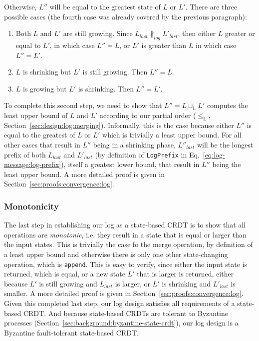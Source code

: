 \documentclass[9pt, oneside]{article}   	%
\begin{document}
Otherwise, $L''$ will be equal to the greatest state of $L$ or $L'$. There are three possible cases (the fourth case was already covered by the previous paragraph):
\begin{enumerate}
	\item Both $L$ and $L'$ are still growing. Since $L_\textit{last} \not\parallel_\textit{log} L'_\textit{last}$, then either $L$ greater or equal to $L'$, in which case $L''=L$, or $L'$ is greater than $L$ in which case $L'' = L'$.
	\item $L$ is shrinking but $L'$ is still growing. Then $L''=L$.
	\item $L$ is growing but $L'$ is shrinking. Then $L''=L'$.
\end{enumerate}

To complete this second step, we need to show that $L''=L \sqcup_\mathds{L} L'$ computes the least upper bound of $L$ and $L'$ according to our partial order ($\leq_\mathds{L}$, Section~\ref{sec:design:log:merging}). Informally, this is the case because either $L''$ is equal to the greatest of $L$ or $L'$ which is trivially a least upper bound. For all other cases that result in $L''$ being in a shrinking phase, $L''_\textit{last}$ will be the longest prefix of both $L_\textit{last}$ and $L'_\textit{last}$ (by definition of \texttt{LogPrefix} in Eq.~\ref{eq:log-message:log-prefix}), itself a greatest lower bound, that result in $L''$ being the least upper bound. A more detailed proof is given in Section~\ref{sec:proofs:convergence:log}.

\subsubsection{Monotonicity}

The last step in establishing our log as a state-based CRDT is to show that all operations are \textit{monotonic}, i.e. they result in a state that is equal or larger than the input states. This is trivially the case fo the merge operation, by definition of a least upper bound and otherwise there is only one other state-changing operation, which is \texttt{append}. This is easy to verify, since either the input state is returned, which is equal, or a new state $L'$ that is larger is returned, either because $L'$ is still growing and $L_\textit{last}$ is larger, or $L'$ is shrinking and $L'_\textit{last}$ is smaller. A more detailed proof is given in Section~\ref{sec:proofs:convergence:log}. Given this completed last step, our log design satisfies all requirements of a state-based CRDT. And because state-based CRDTs are tolerant to Byzantine processes (Section~\ref{sec:background:byzantine-state-crdt}), our log design is a Byzantine fault-tolerant state-based CRDT. 
\end{document}
